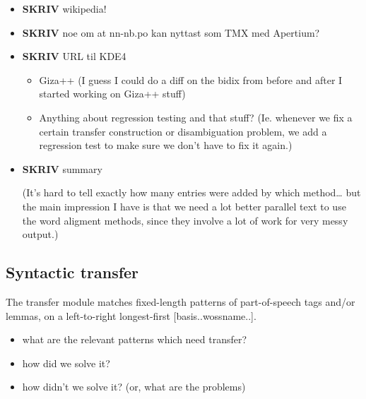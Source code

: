 \documentclass[11pt]{article}
\begin{document}
\begin{itemize}

\item \textbf{SKRIV} wikipedia!\\
\label{sec-3.4.1}


\item \textbf{SKRIV} noe om at nn-nb.po kan nyttast som TMX med Apertium?\\
\label{sec-3.4.2}




\item \textbf{SKRIV} URL til KDE4\\
\label{sec-3.4.3}


\begin{itemize}
\item Giza++ (I guess I could do a diff on the bidix from before and after
  I started working on Giza++ stuff)
\item Anything about regression testing and that stuff? (Ie. whenever we
  fix a certain transfer construction or disambiguation problem, we
  add a regression test to make sure we don't have to fix it again.)
\end{itemize}

\item \textbf{SKRIV} summary\\
\label{sec-3.4.4}

(It's hard to tell exactly how many entries were added by which
method\ldots{} but the main impression I have is that we need a lot better
parallel text to use the word aligment methods, since they involve a
lot of work for very messy output.)

\end{itemize} %
\subsection{Syntactic transfer}
\label{sec-3.5}

The transfer module matches fixed-length patterns of part-of-speech
tags and/or lemmas, on a left-to-right longest-first
[basis..wossname..]. 

\begin{itemize}
\item what are the relevant patterns which need transfer?
\item how did we solve it?
\item how didn't we solve it? (or, what are the problems)
\end{itemize}
\end{document}
